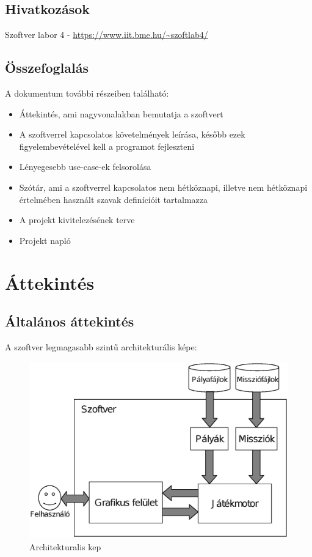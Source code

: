 \subsection{Hivatkozások}
Szoftver labor 4 - \url{https://www.iit.bme.hu/~szoftlab4/}

\subsection{Összefoglalás}
A dokumentum további részeiben található:
\begin{itemize}
\item Áttekintés, ami nagyvonalakban bemutatja a szoftvert
\item A szoftverrel kapcsolatos követelmények leírása, később ezek figyelembevételével kell a programot fejleszteni
\item Lényegesebb use-case-ek felsorolása
\item Szótár, ami a szoftverrel kapcsolatos nem hétköznapi, illetve nem hétköznapi értelmében használt szavak definícióit tartalmazza
\item A projekt kivitelezésének terve
\item Projekt napló
\end{itemize}

\section{Áttekintés}
\subsection{Általános áttekintés}

\begin{nopb}
A szoftver legmagasabb szintű architekturális képe:
\newline
\begin{figure}[H]
\centering
\includegraphics[scale=.7]{images/arch.eps}
\caption{Architekturalis kep}
\label{overflow}
\end{figure}
\end{nopb}

